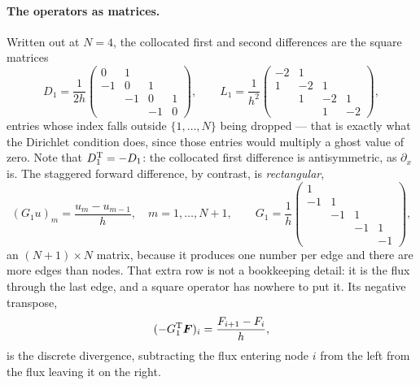 \documentclass[a5paper]{article}
\begin{document}
\paragraph{The operators as matrices.} Written out at $N=4$, the collocated first and second differences are the square matrices
\begin{equation}
    \label{eq:D1-L1-matrices}
    D_1 = \frac{1}{2h}\!\begin{pmatrix} 0&1&&\\ -1&0&1&\\ &-1&0&1\\ &&-1&0 \end{pmatrix}\!,
    \qquad
    L_1 = \frac{1}{h^2}\!\begin{pmatrix} -2&1&&\\ 1&-2&1&\\ &1&-2&1\\ &&1&-2 \end{pmatrix}\!,
\end{equation}
entries whose index falls outside $\{1,\dots,N\}$ being dropped --- that is exactly what the Dirichlet condition does, since those entries would multiply a ghost value of zero. Note that $D_1^{\mathrm{T}} = -D_1$: the collocated first difference is antisymmetric, as $\partial_x$ is. The staggered forward difference, by contrast, is \emph{rectangular},
\begin{equation}
    \label{eq:fwd-diff}
    (G_1 u)_m = \frac{u_m - u_{m-1}}{h},\quad m=1,\dots,N+1,
    \qquad
    G_1 = \frac{1}{h}\!\begin{pmatrix} 1&&&\\ -1&1&&\\ &-1&1&\\ &&-1&1\\ &&&-1 \end{pmatrix}\!,
\end{equation}
an $(N{+}1)\times N$ matrix,
because it produces one number per edge and there are more edges than nodes. That extra row is not a bookkeeping detail: it is the flux through the last edge, and a square operator has nowhere to put it. Its negative transpose,
\begin{equation}
    \label{eq:discrete-div}
    (-G_1^{\mathrm{T}}\boldsymbol F)_i = \frac{F_{i+1}-F_i}{h},
\end{equation}
is the discrete divergence, subtracting the flux entering node $i$ from the left from the flux leaving it on the right.
\end{document}
